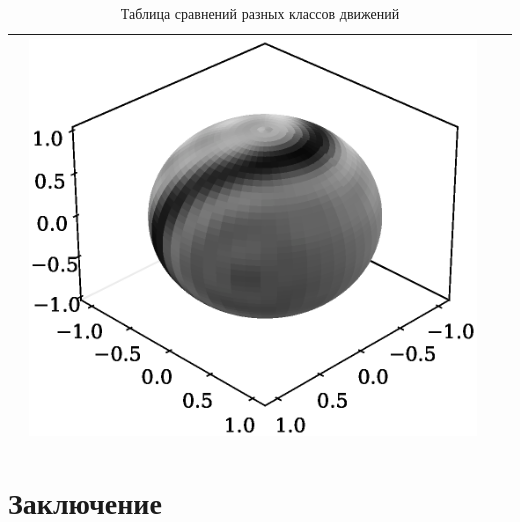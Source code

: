 \documentclass[12pt,twoside]{article}
\begin{document}
\begin{table}
\begin{tabular}{p{0.5cm}p{3cm}p{4cm}p{4cm}}
            & \includegraphics[scale=0.25]{./figs/sph_harm_squats.eps} \\ 
            \hline
        \end{tabular}
    \caption{Таблица сравнений разных классов движений}
    \label{tbl:table_of_figures}
\end{table}



\section{Заключение}
\newpage

\end{document}
